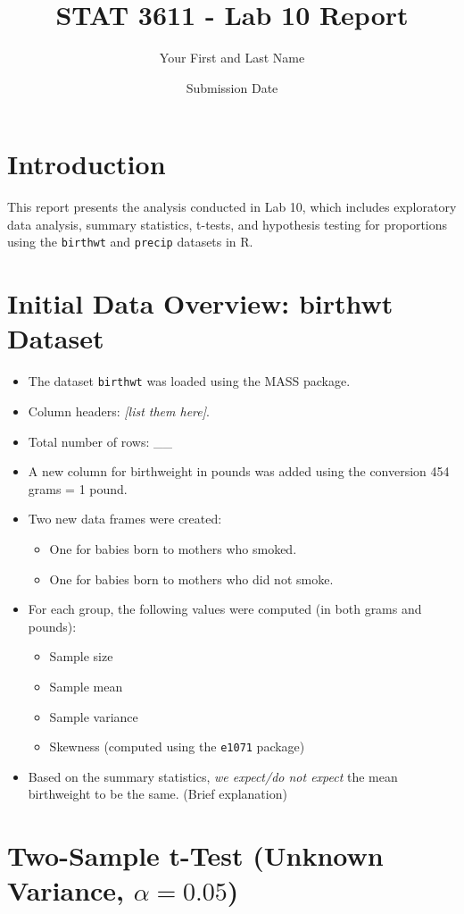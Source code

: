 \documentclass{article}
\title{STAT 3611 - Lab 10 Report}
\author{Your First and Last Name}
\date{Submission Date}
\begin{document}
\maketitle

\section{Introduction}
This report presents the analysis conducted in Lab 10, which includes exploratory data analysis, summary statistics, t-tests, and hypothesis testing for proportions using the \texttt{birthwt} and \texttt{precip} datasets in R.

\section{Initial Data Overview: birthwt Dataset}
\begin{itemize}
    \item The dataset \texttt{birthwt} was loaded using the MASS package.
    \item Column headers: \textit{[list them here]}.
    \item Total number of rows: \_\_
    \item A new column for birthweight in pounds was added using the conversion 454 grams = 1 pound.
    \item Two new data frames were created:
    \begin{itemize}
        \item One for babies born to mothers who smoked.
        \item One for babies born to mothers who did not smoke.
    \end{itemize}
    \item For each group, the following values were computed (in both grams and pounds):
    \begin{itemize}
        \item Sample size
        \item Sample mean
        \item Sample variance
        \item Skewness (computed using the \texttt{e1071} package)
    \end{itemize}
    \item Based on the summary statistics, \textit{we expect/do not expect} the mean birthweight to be the same. (Brief explanation)
\end{itemize}

\section{Two-Sample t-Test (Unknown Variance, \(\alpha = 0.05\))}
\end{document}
